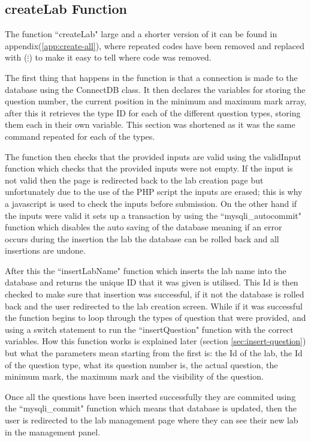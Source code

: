 \documentclass[11pt]{report}
\begin{document}
\subsection*{createLab Function}

The function ``createLab" large and a shorter version of it can be found in appendix(\ref{app:create-all}), where repeated codes have been removed and replaced with ($\vdots$) to make it easy to tell where code was removed. 

The first thing that happens in the function is that a connection is made to the database using the ConnectDB class. It then declares the variables for storing the question number, the current position in the minimum and maximum mark array, after this it retrieves the type ID for each of the different question types, storing them each in their own variable. This section was shortened as it was the same command repeated for each of the types.

The function then checks that the provided inputs are valid using the validInput function which checks that the provided inputs were not empty. If the input is not valid then the page is redirected back to the lab creation page but unfortunately due to the use of the PHP script the inputs are erased; this is why a javascript is used to check the inputs before submission. On the other hand if the inputs were valid it sets up a transaction by using the ``mysqli\_autocommit" function which disables the auto saving of the database meaning if an error occurs during the insertion the lab the database can be rolled back and all insertions are undone.




After this the ``insertLabName" function which inserts the lab name into the database and returns the unique ID that it was given is utilised. This Id is then checked to make sure that insertion was successful, if it not the database is rolled back and the user redirected to the lab creation screen. While if it was successful the function begins to loop through the types of question that were provided, and using a switch statement to run the ``insertQuestion" function with the correct variables. How this function works is explained later (section \ref{sec:insert-question}) but what the parameters mean starting from the first is: the Id of the lab, the Id of the question type, what its question number is, the actual question, the minimum mark, the maximum mark and the visibility of the question.

Once all the questions have been inserted successfully they are commited using the ``mysqli\_commit" function which means that database is updated, then the user is redirected to the lab management page where they can see their new lab in the management panel.
\end{document}
